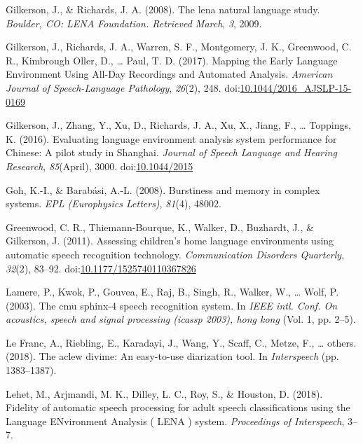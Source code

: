 \documentclass[english,table,man,floatsintext]{apa6}
\begin{document}
\leavevmode\hypertarget{ref-gilkerson2008lena}{}%
Gilkerson, J., \& Richards, J. A. (2008). The lena natural language study. \emph{Boulder, CO: LENA Foundation. Retrieved March}, \emph{3}, 2009.

\leavevmode\hypertarget{ref-Gilkerson2017}{}%
Gilkerson, J., Richards, J. A., Warren, S. F., Montgomery, J. K., Greenwood, C. R., Kimbrough Oller, D., \ldots{} Paul, T. D. (2017). Mapping the Early Language Environment Using All-Day Recordings and Automated Analysis. \emph{American Journal of Speech-Language Pathology}, \emph{26}(2), 248. doi:\href{https://doi.org/10.1044/2016_AJSLP-15-0169}{10.1044/2016\_AJSLP-15-0169}

\leavevmode\hypertarget{ref-Gilkerson2016}{}%
Gilkerson, J., Zhang, Y., Xu, D., Richards, J. A., Xu, X., Jiang, F., \ldots{} Toppings, K. (2016). Evaluating language environment analysis system performance for Chinese: A pilot study in Shanghai. \emph{Journal of Speech Language and Hearing Research}, \emph{85}(April), 3000. doi:\href{https://doi.org/10.1044/2015}{10.1044/2015}

\leavevmode\hypertarget{ref-goh2008burstiness}{}%
Goh, K.-I., \& Barabási, A.-L. (2008). Burstiness and memory in complex systems. \emph{EPL (Europhysics Letters)}, \emph{81}(4), 48002.

\leavevmode\hypertarget{ref-Greenwood2011}{}%
Greenwood, C. R., Thiemann-Bourque, K., Walker, D., Buzhardt, J., \& Gilkerson, J. (2011). Assessing children's home language environments using automatic speech recognition technology. \emph{Communication Disorders Quarterly}, \emph{32}(2), 83--92. doi:\href{https://doi.org/10.1177/1525740110367826}{10.1177/1525740110367826}

\leavevmode\hypertarget{ref-lamere2003cmu}{}%
Lamere, P., Kwok, P., Gouvea, E., Raj, B., Singh, R., Walker, W., \ldots{} Wolf, P. (2003). The cmu sphinx-4 speech recognition system. In \emph{IEEE intl. Conf. On acoustics, speech and signal processing (icassp 2003), hong kong} (Vol. 1, pp. 2--5).

\leavevmode\hypertarget{ref-le2018aclew}{}%
Le Franc, A., Riebling, E., Karadayi, J., Wang, Y., Scaff, C., Metze, F., \ldots{} others. (2018). The aclew divime: An easy-to-use diarization tool. In \emph{Interspeech} (pp. 1383--1387).

\leavevmode\hypertarget{ref-Lehet2018}{}%
Lehet, M., Arjmandi, M. K., Dilley, L. C., Roy, S., \& Houston, D. (2018). Fidelity of automatic speech processing for adult speech classifications using the Language ENvironment Analysis ( LENA ) system. \emph{Proceedings of Interspeech}, 3--7.
\end{document}
